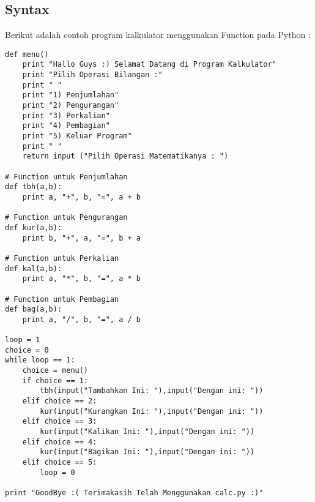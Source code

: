 \subsection{Syntax} 
Berikut adalah contoh program kalkulator menggunakan Function pada Python : 
\begin{verbatim}
def menu()
    print "Hallo Guys :) Selamat Datang di Program Kalkulator"
    print "Pilih Operasi Bilangan :"
    print " "
    print "1) Penjumlahan"
    print "2) Pengurangan"
    print "3) Perkalian"
    print "4) Pembagian"
    print "5) Keluar Program"
    print " "
    return input ("Pilih Operasi Matematikanya : ")

# Function untuk Penjumlahan
def tbh(a,b):
    print a, "+", b, "=", a + b

# Function untuk Pengurangan
def kur(a,b):
    print b, "+", a, "=", b + a

# Function untuk Perkalian
def kal(a,b):
    print a, "*", b, "=", a * b

# Function untuk Pembagian
def bag(a,b):
    print a, "/", b, "=", a / b

loop = 1
choice = 0
while loop == 1:
    choice = menu()
    if choice == 1:
        tbh(input("Tambahkan Ini: "),input("Dengan ini: "))
    elif choice == 2:
        kur(input("Kurangkan Ini: "),input("Dengan ini: "))
    elif choice == 3:
        kur(input("Kalikan Ini: "),input("Dengan ini: "))
    elif choice == 4:
        kur(input("Bagikan Ini: "),input("Dengan ini: "))
    elif choice == 5:
        loop = 0

print "GoodBye :( Terimakasih Telah Menggunakan calc.py :)"
\end{verbatim}

